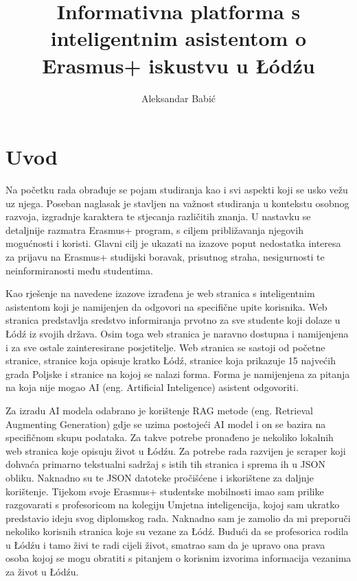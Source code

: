 \documentclass[]{foi}
\title{Informativna platforma s inteligentnim asistentom o Erasmus+ iskustvu u \L\'{o}d\'{z}u}
\author{Aleksandar Babić}
\begin{document}
\maketitle

\tableofcontents

\makeatletter {} \makeatother
\pagestyle{plain}



\chapter{Uvod}

Na početku rada obrađuje se pojam studiranja kao i svi aspekti koji se usko vežu uz njega. Poseban naglasak je stavljen na važnost studiranja u kontekstu osobnog razvoja, izgradnje karaktera
te stjecanja različitih znanja. U nastavku se detaljnije razmatra Erasmus+ program, s ciljem približavanja njegovih mogućnosti i koristi. Glavni cilj je ukazati na izazove poput nedostatka interesa
za prijavu na Erasmus+ studijski boravak, prisutnog straha, nesigurnosti te neinformiranosti među studentima. 

Kao rješenje na navedene izazove izrađena je web stranica s inteligentnim asistentom koji je namijenjen da odgovori na specifične upite korisnika. Web stranica predstavlja sredstvo informiranja 
prvotno za sve studente koji dolaze u Łódź iz svojih država. Osim toga web stranica je naravno dostupna i namijenjena i za sve ostale zainteresirane posjetitelje. Web stranica se sastoji od 
početne stranice, stranice koja opisuje kratko Łódź, stranice koja prikazuje 15 najvećih grada Poljske i stranice na kojoj se nalazi forma. Forma je namijenjena za pitanja na koja nije mogao 
AI (eng. Artificial Inteligence) asistent odgovoriti. 

Za izradu AI modela odabrano je korištenje RAG metode (eng. Retrieval Augmenting Generation) gdje se uzima postojeći AI model i on se bazira na specifičnom skupu podataka. 
Za takve potrebe pronađeno je nekoliko lokalnih web stranica koje opisuju život u Łódźu. Za potrebe rada razvijen je scraper koji dohvaća primarno tekstualni sadržaj s istih tih stranica
i sprema ih u JSON obliku. Naknadno su te JSON datoteke pročišćene i iskorištene za daljnje korištenje. Tijekom svoje Erasmus+ studentske mobilnosti imao sam prilike razgovarati s profesoricom na 
kolegiju Umjetna inteligencija, kojoj sam ukratko predstavio ideju svog diplomskog rada. Naknadno sam je zamolio da mi preporuči nekoliko korisnih stranica koje su vezane za Łódź. Budući da se profesorica rodila u Łódźu i tamo živi te radi cijeli život, smatrao sam da je upravo ona prava osoba kojoj se mogu obratiti
s pitanjem o korisnim izvorima informacija vezanima za život u Łódźu. 
\end{document}
